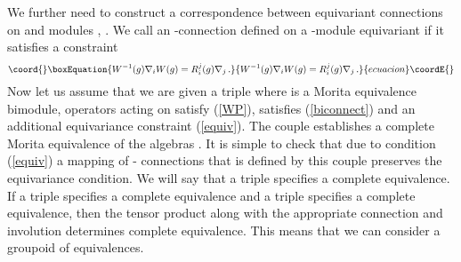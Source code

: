 \documentclass[a4paper,a4paper]{article}
\begin{document}
{We further need to construct a correspondence between equivariant connections  on \coordHE{} and \coordHE{} 
modules \coordHE{}, \coordHE{}. We call an  \coordHE{}-connection \coordHE{} defined on a \coordHE{}-module \coordHE{} 
equivariant if it satisfies a constraint 
\begin{equation}\coord{}\boxEquation{ \label{equiv}
W^{-1}(g)\nabla_{i}W(g) = R^{j}_{i}(g)\nabla_{j} \, .
}{ W^{-1}(g)\nabla_{i}W(g) = R^{j}_{i}(g)\nabla_{j} \, .
}{ecuacion}\coordE{}\end{equation}
Now let us assume  that we are given a triple \coordHE{} where \coordHE{} is a 
 \coordHE{} Morita equivalence bimodule, operators \coordHE{} acting on \coordHE{} satisfy (\ref{WP}), 
 \coordHE{} satisfies (\ref{biconnect}) and an additional equivariance constraint (\ref{equiv}).
The couple \coordHE{} establishes a complete Morita equivalence of the algebras \coordHE{}. 
It is simple to check that due to condition (\ref{equiv}) a mapping of  \coordHE{}- connections that is defined by this 
couple preserves the equivariance condition. We will say that a triple \coordHE{} specifies a 
\coordHE{} complete equivalence. 
If a triple \coordHE{} specifies a \coordHE{} complete 
equivalence and a triple  \coordHE{} specifies a 
\coordHE{} complete equivalence, then the tensor product 
\coordHE{} along with the appropriate connection \coordHE{} and 
involution \coordHE{} determines \coordHE{} complete equivalence. This means that we 
can consider a groupoid of equivalences. 



}
\end{document}
